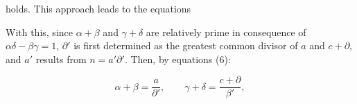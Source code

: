 
holds. This approach leads to the equations


With this, since $\alpha+\beta$ and $\gamma+\delta$ are relatively prime in
consequence of $\alpha\delta-\beta\gamma = 1$, $\partial'$ is first determined as the
greatest common divisor of $a$ and $c+\partial$, and $a'$ results from
$n = a'\partial'$. Then, by equations (6):

\[
\alpha+\beta = \frac{a}{\partial'}, \qquad \gamma+\delta = \frac{c+\partial}{\beta'}, %
\]
